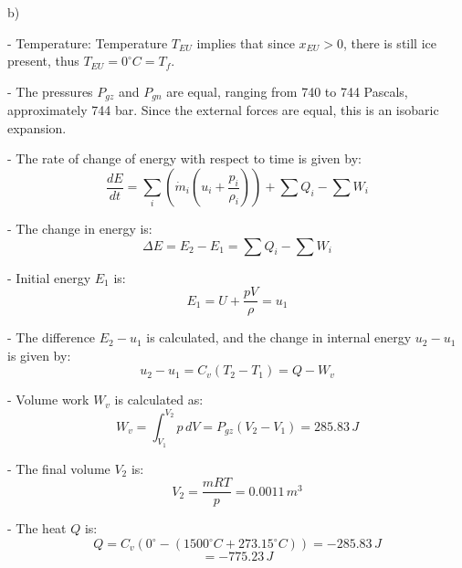 b)

- Temperature: Temperature \( T_{EU} \) implies that since \( x_{EU} > 0 \), there is still ice present, thus \( T_{EU} = 0^\circ C = T_f \).

- The pressures \( P_{gz} \) and \( P_{gn} \) are equal, ranging from 740 to 744 Pascals, approximately 744 bar. Since the external forces are equal, this is an isobaric expansion.

- The rate of change of energy with respect to time is given by:
  \[
  \frac{dE}{dt} = \sum_i (\dot{m}_i (u_i + \frac{p_i}{\rho_i})) + \sum Q_i - \sum W_i
  \]

- The change in energy is:
  \[
  \Delta E = E_2 - E_1 = \sum Q_i - \sum W_i
  \]

- Initial energy \( E_1 \) is:
  \[
  E_1 = U + \frac{pV}{\rho} = u_1
  \]

- The difference \( E_2 - u_1 \) is calculated, and the change in internal energy \( u_2 - u_1 \) is given by:
  \[
  u_2 - u_1 = C_v (T_2 - T_1) = Q - W_v
  \]

- Volume work \( W_v \) is calculated as:
  \[
  W_v = \int_{V_1}^{V_2} p \, dV = P_{gz} (V_2 - V_1) = 285.83 \, J
  \]

- The final volume \( V_2 \) is:
  \[
  V_2 = \frac{mRT}{p} = 0.0011 \, m^3
  \]

- The heat \( Q \) is:
  \[
  Q = C_v (0^\circ - (1500^\circ C + 273.15^\circ C)) = -285.83 \, J
  \]
  \[
  = -775.23 \, J
  \]